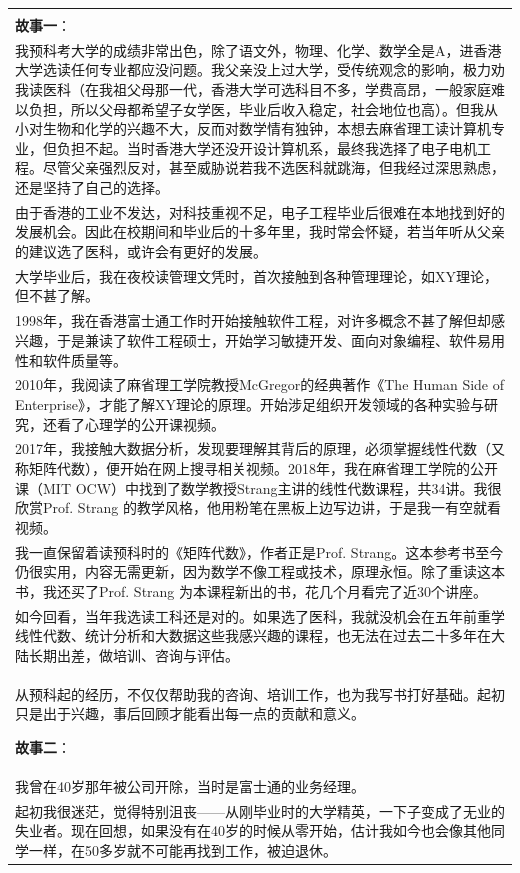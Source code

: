 \begin{longtable}[]{@{}l@{}}
\toprule
\endhead
\begin{minipage}[t]{0.97\columnwidth}\raggedright
回想我自己过去的人生旅程，也能说出我的故事：\\
\textbf{故事一}：\\
我预科考大学的成绩非常出色，除了语文外，物理、化学、数学全是A，进香港大学选读任何专业都应没问题。我父亲没上过大学，受传统观念的影响，极力劝我读医科（在我祖父母那一代，香港大学可选科目不多，学费高昂，一般家庭难以负担，所以父母都希望子女学医，毕业后收入稳定，社会地位也高）。但我从小对生物和化学的兴趣不大，反而对数学情有独钟，本想去麻省理工读计算机专业，但负担不起。当时香港大学还没开设计算机系，最终我选择了电子电机工程。尽管父亲强烈反对，甚至威胁说若我不选医科就跳海，但我经过深思熟虑，还是坚持了自己的选择。\\
由于香港的工业不发达，对科技重视不足，电子工程毕业后很难在本地找到好的发展机会。因此在校期间和毕业后的十多年里，我时常会怀疑，若当年听从父亲的建议选了医科，或许会有更好的发展。\\
大学毕业后，我在夜校读管理文凭时，首次接触到各种管理理论，如XY理论，但不甚了解。\\
1998年，我在香港富士通工作时开始接触软件工程，对许多概念不甚了解但却感兴趣，于是兼读了软件工程硕士，开始学习敏捷开发、面向对象编程、软件易用性和软件质量等。\\
2010年，我阅读了麻省理工学院教授McGregor的经典著作《The Human Side of
Enterprise》，才能了解XY理论的原理。开始涉足组织开发领域的各种实验与研究，还看了心理学的公开课视频。\\
2017年，我接触大数据分析，发现要理解其背后的原理，必须掌握线性代数（又称矩阵代数），便开始在网上搜寻相关视频。2018年，我在麻省理工学院的公开课（MIT
OCW）中找到了数学教授Strang主讲的线性代数课程，共34讲。我很欣赏Prof.
Strang 的教学风格，他用粉笔在黑板上边写边讲，于是我一有空就看视频。\\
我一直保留着读预科时的《矩阵代数》，作者正是Prof.
Strang。这本参考书至今仍很实用，内容无需更新，因为数学不像工程或技术，原理永恒。除了重读这本书，我还买了Prof.
Strang 为本课程新出的书，花几个月看完了近30个讲座。\\
如今回看，当年我选读工科还是对的。如果选了医科，我就没机会在五年前重学线性代数、统计分析和大数据这些我感兴趣的课程，也无法在过去二十多年在大陆长期出差，做培训、咨询与评估。\\
从预科起的经历，不仅仅帮助我的咨询、培训工作，也为我写书打好基础。起初只是出于兴趣，事后回顾才能看出每一点的贡献和意义。

\textbf{故事二}：\\
我曾在40岁那年被公司开除，当时是富士通的业务经理。\\
起初我很迷茫，觉得特别沮丧------从刚毕业时的大学精英，一下子变成了无业的失业者。现在回想，如果没有在40岁的时候从零开始，估计我如今也会像其他同学一样，在50多岁就不可能再找到工作，被迫退休。


\end{minipage}
\end{longtable}
